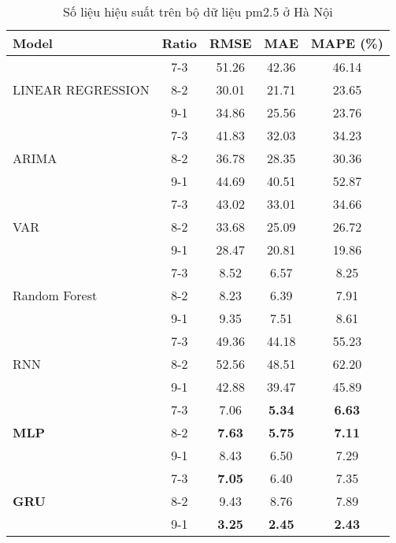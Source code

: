 \begin{table}[h!]
    \centering
    \renewcommand{\arraystretch}{1.15}
    \caption{Số liệu hiệu suất trên bộ dữ liệu pm2.5 ở Hà Nội}
    \begin{tabular}{|l|c|c|c|c|}
    \hline
    \rowcolor{orange!30} \textbf{Model} & \textbf{Ratio} & \textbf{RMSE} & \textbf{MAE} & \textbf{MAPE (\%)} \\ \hline
    \rowcolor{white}  & 7-3 & 51.26 & 42.36 & 46.14 \\ 
    \rowcolor{white}  LINEAR REGRESSION & 8-2 & 30.01 & 21.71 & 23.65 \\ 
    \rowcolor{white}  & 9-1 & 34.86 & 25.56 & 23.76 \\ \hline
    \rowcolor{white}  & 7-3 & 41.83 & 32.03 & 34.23 \\ 
    \rowcolor{white} ARIMA & 8-2 & 36.78 & 28.35 & 30.36 \\ 
    \rowcolor{white}  & 9-1 & 44.69 & 40.51 & 52.87 \\ \hline
    \rowcolor{white}  & 7-3 & 43.02 & 33.01 & 34.66 \\ 
    \rowcolor{white} VAR & 8-2 & 33.68 & 25.09 & 26.72 \\ 
    \rowcolor{white}  & 9-1 & 28.47 & 20.81 & 19.86 \\ \hline
    \rowcolor{white} & 7-3 & 8.52 & 6.57 & 8.25 \\ 
    \rowcolor{white} Random Forest & 8-2 & 8.23 & 6.39 & 7.91 \\ 
    \rowcolor{white} & 9-1 & 9.35 & 7.51 & 8.61 \\ \hline
    \rowcolor{white}  & 7-3 & 49.36 & 44.18 & 55.23 \\ 
    \rowcolor{white} RNN & 8-2 & 52.56 & 48.51 & 62.20 \\
    \rowcolor{white}  & 9-1 & 42.88 & 39.47 & 45.89 \\ \hline
    \rowcolor{white}  & 7-3 & 7.06 & \textbf{5.34} & \textbf{6.63} \\
    \rowcolor{white}  \textbf{MLP} & 8-2 & \textbf{7.63} & \textbf{5.75} & \textbf{7.11}  \\ 
    \rowcolor{white}  & 9-1 & 8.43 & 6.50 & 7.29 \\ \hline
    \rowcolor{white}  & 7-3 & \textbf{7.05} & 6.40 & 7.35 \\ 
    \rowcolor{white} \textbf{GRU} & 8-2 & 9.43 & 8.76 & 7.89  \\ 
    \rowcolor{white}  & 9-1 & \textbf{3.25} & \textbf{2.45} & \textbf{2.43} \\ \hline

\end{tabular}
\end{table}
